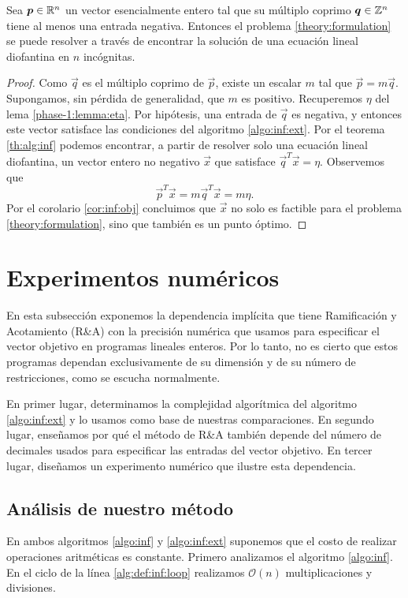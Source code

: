 \begin{theorem}
	\label{infinite:th:complexity}
	Sea $\boldsymbol{p} \in \mathbb{R}^n$ un vector esencialmente entero tal que su múltiplo coprimo $\boldsymbol{q} \in
	\mathbb{Z}^n$ tiene al menos una entrada negativa. Entonces el problema \eqref{theory:formulation} se
	puede resolver a través de encontrar la solución de una ecuación lineal diofantina en $n$
	incógnitas.
\end{theorem}
\begin{proof}
	Como $\vec{q}$ es el múltiplo coprimo de $\vec{p}$, existe un escalar $m$ tal que
	$\vec{p} = m\vec{q}$. Supongamos, sin pérdida de generalidad, que $m$ es positivo. Recuperemos
	$\eta$ del lema \ref{phase-1:lemma:eta}. Por hipótesis, una entrada de $\vec{q}$ es negativa, y
	entonces este vector satisface las condiciones del algoritmo \ref{algo:inf:ext}. Por el teorema
	\ref{th:alg:inf} podemos encontrar, a partir de resolver solo una ecuación lineal diofantina, un
	vector entero no negativo $\vec{x}$ que satisface $\vec{q}^T\vec{x} = \eta$. Observemos que
	\begin{equation*}
		\vec{p}^T\vec{x} = m\vec{q}^T\vec{x} = m\eta.
	\end{equation*}
	Por el corolario \ref{cor:inf:obj} concluimos que $\vec{x}$ no solo es factible para el problema
	\eqref{theory:formulation}, sino que también es un punto óptimo.
\end{proof}

\section{Experimentos numéricos}
\label{sec:inf:exp}
\noindent
En esta subsección exponemos la dependencia implícita que tiene Ramificación y Acotamiento (R\&A)
con la precisión numérica que usamos para especificar el vector objetivo en programas lineales
enteros. Por lo tanto, no es cierto que estos programas dependan exclusivamente de su dimensión y de
su número de restricciones, como se escucha normalmente.

En primer lugar, determinamos la complejidad algorítmica del algoritmo \ref{algo:inf:ext} y lo
usamos como base de nuestras comparaciones. En segundo lugar, enseñamos por qué el método de R\&A
también depende del número de decimales usados para especificar las entradas del vector objetivo. En
tercer lugar, diseñamos un experimento numérico que ilustre esta dependencia.

\subsection{Análisis de nuestro método}
\label{subsec:inf:complex}
\noindent
En ambos algoritmos \ref{algo:inf} y \ref{algo:inf:ext} suponemos que el costo de realizar
operaciones aritméticas es constante. Primero analizamos el algoritmo \ref{algo:inf}. En el ciclo de
la línea \ref{alg:def:inf:loop} realizamos $\mathcal{O}(n)$ multiplicaciones y divisiones.

